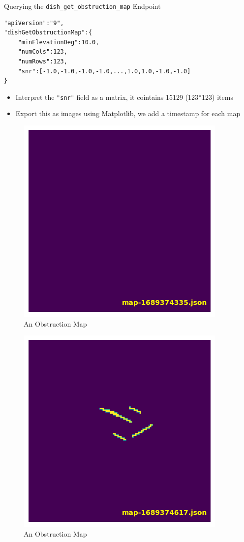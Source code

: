 \documentclass[NET,english,beameralt]{tumbeamer}
\begin{document}
\begin{frame}[fragile]{Querying the \texttt{dish\_get\_obstruction\_map} Endpoint }
    \begin{lstlisting}
"apiVersion":"9",
"dishGetObstructionMap":{
    "minElevationDeg":10.0,
    "numCols":123,
    "numRows":123,
    "snr":[-1.0,-1.0,-1.0,-1.0,...,1.0,1.0,-1.0,-1.0]
}
    \end{lstlisting}
    \begin{itemize}
        \item Interpret the \texttt{"snr"} field as a matrix, it cointains 15129 (123*123) items
        \item Export this as images using Matplotlib, we add a timestamp for each map
    \end{itemize}
\end{frame}

\begin{frame}[fragile]
    \begin{figure}
        \includegraphics[width=0.4\columnwidth]{pics/map1.png}
        \caption{An Obstruction Map}
    \end{figure}
\end{frame}

\begin{frame}[fragile]
    \begin{figure}
        \includegraphics[width=0.4\columnwidth]{pics/map2.png}
        \caption{An Obstruction Map}
    \end{figure}
\end{frame}
\end{document}
